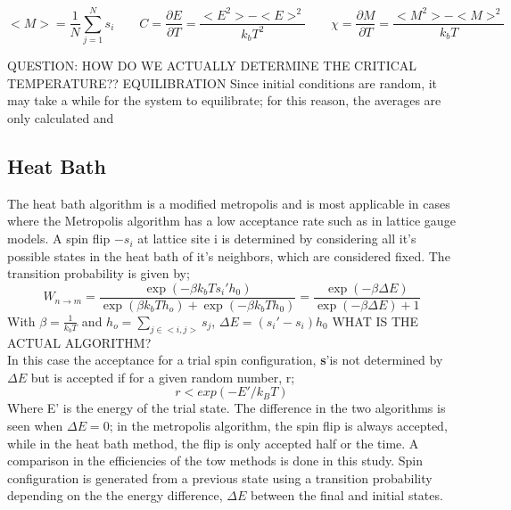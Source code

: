 \documentclass[12pt]{article}
\begin{document}
$$ <M> =\frac{1}{N} \sum_{j=1}^N s_i \quad \quad C = \frac{\partial E}{\partial T}=\frac{<E^2>- <E>^2}{k_bT^2}\quad\quad \chi = \frac{\partial M}{\partial T}=\frac{<M^2>-<M>^2}{k_bT}  $$

QUESTION: HOW DO WE ACTUALLY DETERMINE THE CRITICAL TEMPERATURE??
EQUILIBRATION
Since initial conditions are random, it may take a while for the  system to equilibrate; for this reason, the averages are only calculated and 

\subsection{Heat Bath}
The heat bath algorithm is a modified metropolis and is most applicable in cases where the Metropolis algorithm has a low acceptance rate such as in lattice gauge models.
A spin flip $-s_i$ at lattice site i is determined by considering all it's possible states in the heat bath of it's neighbors, which are considered fixed. The transition probability is given by;
\begin{equation}
W_{n\to m} = \frac{\exp\left(-\beta k_bT s_i'h_0\right)}{\exp\left(\beta k_bT  h_o\right) + \exp\left(-\beta k_bT h_0\right)   } = \frac{\exp\left(-\beta \Delta E\right)}{\exp\left(-\beta\Delta E  \right)+1}
\end{equation}
With $\beta = \frac{1}{k_bT}$ and $h_o = \sum_{j \in <i,j>} s_j$, $\Delta E = (s_i' - s_i)h_0$
WHAT IS THE ACTUAL ALGORITHM?\\
 In this case the acceptance for a trial spin configuration, \textbf {s}'is not determined by $\Delta E$ but is accepted if for a given random number, r;
$$ r< exp\left(-E'/k_B T\right) $$
Where E' is the energy of the trial state.
The difference in the two algorithms is seen when $\Delta E = 0$; in the metropolis algorithm, the spin flip is always accepted, while in the heat bath method, the flip is only accepted half or the time. A comparison in the efficiencies of the tow methods is done in this study.
Spin configuration is generated from a previous state using a transition probability depending on the the energy difference, $\Delta E$ between the final and initial states.
\end{document}
